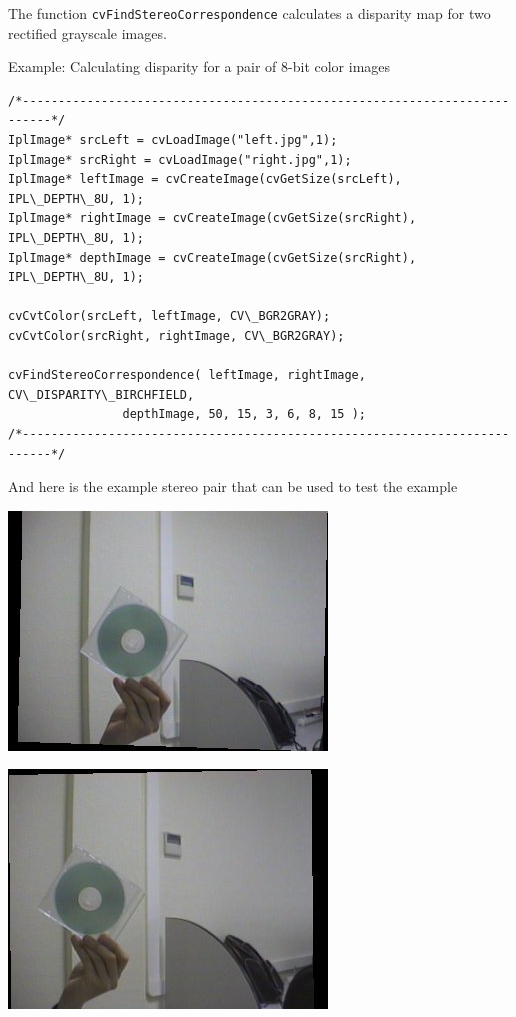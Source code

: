 The function \texttt{cvFindStereoCorrespondence} calculates a disparity map for two rectified grayscale images.

Example: Calculating disparity for a pair of 8-bit color images

\begin{lstlisting}
/*--------------------------------------------------------------------------*/
IplImage* srcLeft = cvLoadImage("left.jpg",1);
IplImage* srcRight = cvLoadImage("right.jpg",1);
IplImage* leftImage = cvCreateImage(cvGetSize(srcLeft), IPL\_DEPTH\_8U, 1);
IplImage* rightImage = cvCreateImage(cvGetSize(srcRight), IPL\_DEPTH\_8U, 1);
IplImage* depthImage = cvCreateImage(cvGetSize(srcRight), IPL\_DEPTH\_8U, 1);

cvCvtColor(srcLeft, leftImage, CV\_BGR2GRAY);
cvCvtColor(srcRight, rightImage, CV\_BGR2GRAY);

cvFindStereoCorrespondence( leftImage, rightImage, CV\_DISPARITY\_BIRCHFIELD, 
			    depthImage, 50, 15, 3, 6, 8, 15 );
/*--------------------------------------------------------------------------*/

\end{lstlisting}

And here is the example stereo pair that can be used to test the example

\includegraphics{pics/left.jpg}

\includegraphics{pics/right.jpg}

